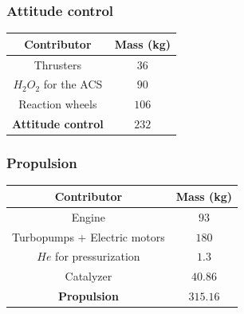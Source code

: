 \subsubsection{Attitude control}
\begin{center}
	\begin{tabular}[H]{|c|c|}
		\hline
		\cellcolor{gray!50}Contributor & \cellcolor{gray!50}Mass (kg)\\
		\hline
		Thrusters & $36$\\
		\hline
		$H_2O_2$ for the ACS & $90$\\
		\hline
		
		Reaction wheels & $106$\\
		\hline
		\cellcolor{green!30}\textbf{Attitude control} & \textbf{$232$}\\
		\hline
	\end{tabular}
\end{center}
\subsubsection{Propulsion}
\begin{center}
	\begin{tabular}[H]{|c|c|}
		\hline
		\cellcolor{gray!50}Contributor & \cellcolor{gray!50}Mass (kg)\\
		\hline
		Engine & $93$\\
		\hline
		Turbopumps + Electric motors & $180$\\
		\hline
		$He$ for pressurization & $1.3$\\
		\hline
		Catalyzer & $40.86$\\
		\hline
		\cellcolor{green!30}\textbf{Propulsion} & \textbf{$315.16$}\\
		\hline
	\end{tabular}
\end{center}
